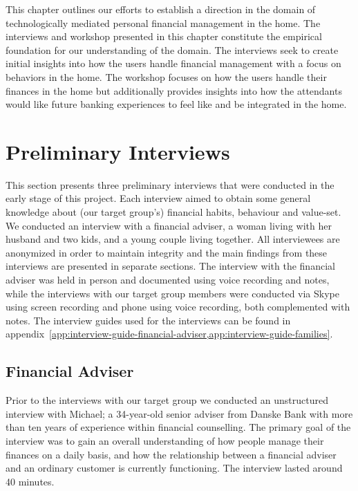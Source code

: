 This chapter outlines our efforts to establish a direction in the domain of technologically mediated personal financial management in the home. The interviews and workshop presented in this chapter constitute the empirical foundation for our understanding of the domain. The interviews seek to create initial insights into how the users handle financial management with a focus on behaviors in the home. The workshop focuses on how the users handle their finances in the home but additionally provides insights into how the attendants would like future banking experiences to feel like and be integrated in the home.

\section{Preliminary Interviews}
This section presents three preliminary interviews that were conducted in the early stage of this project. Each interview aimed to obtain some general knowledge about (our target group’s) financial habits, behaviour and value-set. We conducted an interview with a financial adviser, a woman living with her husband and two kids, and a young couple living together. All interviewees are anonymized in order to maintain integrity and the main findings from these interviews are presented in separate sections. The interview with the financial adviser was held in person and documented using voice recording and notes, while the interviews with our target group members were conducted via Skype using screen recording and phone using voice recording, both complemented with notes. The interview guides used for the interviews can be found in appendix~\ref{app:interview-guide-financial-adviser,app:interview-guide-families}.

\subsection{Financial Adviser}
Prior to the interviews with our target group we conducted an unstructured interview \cite[chapter~7]{sharp2007interaction} with Michael; a 34-year-old senior adviser from Danske Bank with more than ten years of experience within financial counselling. The primary goal of the interview was to gain an overall understanding of how people manage their finances on a daily basis, and how the relationship between a financial adviser and an ordinary customer is currently functioning. The interview lasted around 40 minutes.\\

